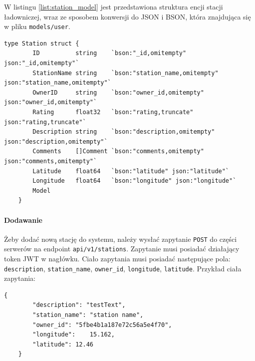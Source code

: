 W listingu \ref{list:station_model} jest przedstawiona struktura encji stacji ładowniczej, wraz ze sposobem konwersji do JSON i BSON, która znajdująca się w pliku \texttt{models/user}.
\begin{lstlisting}[label=list:station_model,caption=Model danych stacji ładowniczej,basicstyle=\tiny\ttfamily]
    type Station struct {
        ID          string    `bson:"_id,omitempty" json:"_id,omitempty"`
        StationName string    `bson:"station_name,omitempty" json:"station_name,omitempty"`
        OwnerID     string    `bson:"owner_id,omitempty" json:"owner_id,omitempty"`
        Rating      float32   `bson:"rating,truncate" json:"rating,truncate"`
        Description string    `bson:"description,omitempty" json:"description,omitempty"`
        Comments    []Comment `bson:"comments,omitempty" json:"comments,omitempty"`
        Latitude    float64   `bson:"latitude" json:"latitude"`
        Longitude   float64   `bson:"longitude" json:"longitude"`
        Model
    }
\end{lstlisting}

\paragraph{Dodawanie}
Żeby dodać nową stację do systemu, należy wysłać zapytanie \texttt{POST} do części serwerów na endpoint \texttt{api/v1/stations}. Zapytanie musi posiadać działający token JWT w nagłówku. Ciało zapytania musi posiadać następujące pola: \texttt{description}, \texttt{station\_name}, \texttt{owner\_id}, \texttt{longitude}, \texttt{latitude}.
Przykład ciała zapytania:
\begin{lstlisting}[basicstyle=\tiny\ttfamily]
    {
		"description": "testText",
		"station_name": "station name",
		"owner_id": "5fbe4b1a187e72c56a5e4f70",
		"longitude":    15.162,
		"latitude": 12.46
    }
\end{lstlisting}

